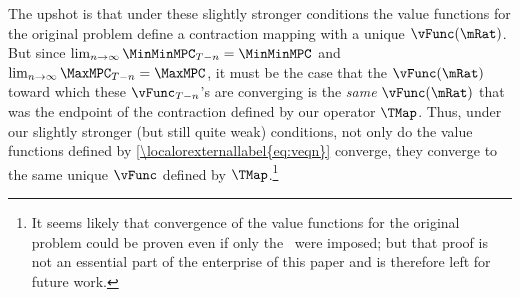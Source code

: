 \documentclass[\econtexRoot/BufferStockTheory.tex]{subfiles}
\begin{document}
The upshot is that under these slightly stronger conditions the value
functions for the original problem define a contraction mapping with a
unique $\vFunc(\mRat)$.  But since $\lim_{n \rightarrow \infty}
\MinMinMPC_{T-n} = \MinMinMPC$ and $\lim_{n \rightarrow \infty}
\MaxMPC_{T-n} = \MaxMPC$, it must be the case that the $\vFunc(\mRat)$
toward which these $\vFunc_{T-n}$'s are converging is the {\it same}
$\vFunc(\mRat)$ that was the endpoint of the contraction defined by
our operator $\TMap$.  Thus, under our slightly stronger (but still
quite weak) conditions, not only do the value functions defined by
\eqref{\localorexternallabel{eq:veqn}} converge, they converge to the same unique $\vFunc$
defined by $\TMap$.\footnote{It seems likely that convergence of the
  value functions for the original problem could be proven even if
  only the \WRIC~were imposed; but that proof is not an essential part
  of the enterprise of this paper and is therefore left for future
  work.}

\onlyinsubfile{}
\end{document}
